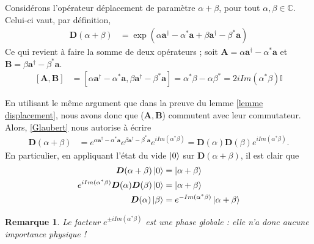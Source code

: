 \documentclass[11pt,oneside,a4paper]{article}
\newtheorem{remark}[theorem]{Remarque}
\begin{document}
Considérons l'opérateur déplacement de paramètre $\alpha+\beta$, pour tout $\alpha,\beta\in\mathbb{C}$. Celui-ci vaut, par définition,
\begin{align}
  \bm{D}(\alpha+\beta) &= \exp(\alpha\bm{a}^\dagger-\alpha^*\bm{a}+\beta\bm{a}^\dagger-\beta^*\bm{a})
\end{align}
Ce qui revient à faire la somme de deux opérateurs ; soit $\bm{A} = \alpha\bm{a}^\dagger-\alpha^*\bm{a}$ et $\bm{B} = \beta\bm{a}^\dagger-\beta^*\bm{a}$.
\begin{align}
  \left[\bm{A},\bm{B}\right] &= \left[\alpha\bm{a}^\dagger-\alpha^*\bm{a},\beta\bm{a}^\dagger-\beta^*\bm{a}\right] = \alpha^*\beta-\alpha\beta^* = 2i Im(\alpha^*\beta)\mathbb{I}
\end{align}

En utilisant le même argument que dans la preuve du lemme \ref{lemme displacement}, nous avons donc que ($\bm{A},\bm{B}$) commutent avec leur commutateur. Alors, \eqref{Glaubert} nous autorise à écrire
\begin{align}
  \bm{D}(\alpha+\beta) &= e^{\alpha\bm{a}^\dagger-\alpha^*\bm{a}}e^{\beta\bm{a}^\dagger-\beta^*\bm{a}}e^{iIm(\alpha^*\beta)} = \bm{D}(\alpha)\bm{D}(\beta)e^{iIm(\alpha^*\beta)}.
\end{align}
En particulier, en appliquant l'état du vide $\ket{0}$ sur $\bm{D}(\alpha+\beta)$, il est clair que
\begin{align}
  \bm{D}(\alpha+\beta)\ket{0} &= \ket{\alpha+\beta}\notag\\
  e^{iIm(\alpha^*\beta)}\bm{D}(\alpha)\bm{D}(\beta)\ket{0} &= \ket{\alpha+\beta}\notag\\
  \bm{D}(\alpha)\ket{\beta} &= e^{-Im(\alpha^*\beta)}\ket{\alpha+\beta}\label{eq:deplacement sur etat coherent}
\end{align}
\begin{remark}
  Le facteur $e^{\pm iIm(\alpha^*\beta)}$ est une phase globale : elle n'a donc aucune importance physique ! 
\end{remark}
\end{document}
